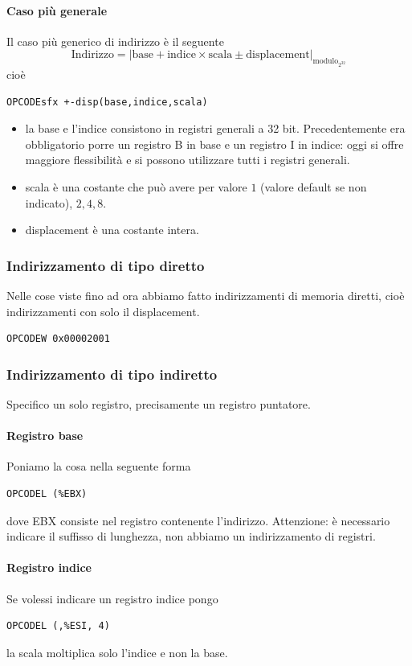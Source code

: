 \documentclass[11pt]{report}
\begin{document}
\paragraph{Caso più generale} Il caso più generico di indirizzo è il seguente
\[\text{Indirizzo}=\left|\text{base}+\text{indice}\times\text{scala} \pm \text{displacement}\right|_{\text{modulo}_{2^{32}}}\]
cioè 
\begin{verbatim}
OPCODEsfx +-disp(base,indice,scala)
\end{verbatim}
\begin{itemize}
\item la base e l'indice consistono in registri generali a 32 bit. Precedentemente era obbligatorio porre un registro B in base e un registro I in indice: oggi si offre maggiore flessibilità e si possono utilizzare tutti i registri generali.
\item scala è una costante che può avere per valore $1$ (valore default se non indicato), $2,4,8$.
\item displacement è una costante intera. 
\end{itemize}
\subsubsection{Indirizzamento di tipo diretto}
Nelle cose viste fino ad ora abbiamo fatto indirizzamenti di memoria diretti, cioè indirizzamenti con solo il displacement.
\begin{verbatim}
OPCODEW 0x00002001
\end{verbatim}
\subsubsection{Indirizzamento di tipo indiretto}
Specifico un solo registro, precisamente un registro puntatore. 
\paragraph{Registro base} Poniamo la cosa nella seguente forma
\begin{verbatim}
OPCODEL (%EBX)
\end{verbatim}
dove EBX consiste nel registro contenente l'indirizzo. Attenzione: è necessario indicare il suffisso di lunghezza, non abbiamo un indirizzamento di registri.
\paragraph{Registro indice} Se volessi indicare un registro indice pongo
\begin{verbatim}
OPCODEL (,%ESI, 4)
\end{verbatim}
la scala moltiplica solo l'indice e non la base.
\end{document}

